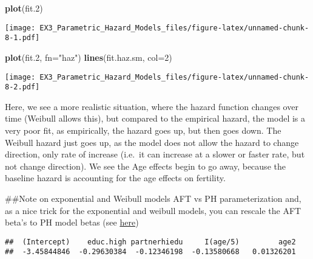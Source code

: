 \documentclass[
]{article}
\newenvironment{Shaded}{\begin{snugshade}}{\end{snugshade}}
\newcommand{\CommentTok}[1]{\textcolor[rgb]{0.56,0.35,0.01}{\textit{#1}}}
\newcommand{\DataTypeTok}[1]{\textcolor[rgb]{0.13,0.29,0.53}{#1}}
\newcommand{\DecValTok}[1]{\textcolor[rgb]{0.00,0.00,0.81}{#1}}
\newcommand{\FloatTok}[1]{\textcolor[rgb]{0.00,0.00,0.81}{#1}}
\newcommand{\KeywordTok}[1]{\textcolor[rgb]{0.13,0.29,0.53}{\textbf{#1}}}
\newcommand{\NormalTok}[1]{#1}
\newcommand{\OperatorTok}[1]{\textcolor[rgb]{0.81,0.36,0.00}{\textbf{#1}}}
\newcommand{\StringTok}[1]{\textcolor[rgb]{0.31,0.60,0.02}{#1}}
\begin{document}
\begin{Shaded}
\begin{Highlighting}[]
\KeywordTok{plot}\NormalTok{(fit}\FloatTok{.2}\NormalTok{)}
\end{Highlighting}
\end{Shaded}

\texttt{[image: EX3\_Parametric\_Hazard\_Models\_files/figure-latex/unnamed-chunk-8-1.pdf]}

\begin{Shaded}
\begin{Highlighting}[]
\KeywordTok{plot}\NormalTok{(fit}\FloatTok{.2}\NormalTok{, }\DataTypeTok{fn=}\StringTok{"haz"}\NormalTok{)}
\KeywordTok{lines}\NormalTok{(fit.haz.sm, }\DataTypeTok{col=}\DecValTok{2}\NormalTok{)}
\end{Highlighting}
\end{Shaded}

\texttt{[image: EX3\_Parametric\_Hazard\_Models\_files/figure-latex/unnamed-chunk-8-2.pdf]}

Here, we see a more realistic situation, where the hazard function
changes over time (Weibull allows this), but compared to the empirical
hazard, the model is a very poor fit, as empirically, the hazard goes
up, but then goes down. The Weibull hazard just goes up, as the model
does not allow the hazard to change direction, only rate of increase
(i.e.~it can increase at a slower or faster rate, but not change
direction). We see the Age effects begin to go away, because the
baseline hazard is accounting for the age effects on fertility.

\#\#Note on exponential and Weibull models AFT vs PH parameterization
and, as a nice trick for the exponential and weibull models, you can
rescale the AFT beta's to PH model betas (see
\href{http://www.statisticsmentor.com/2012/12/25/r-relationship-between-accelerated-failure-model-and-the-proportional-hazard-model-for-weibull/}{here})

\begin{Shaded}
\end{Shaded}

\begin{verbatim}
##  (Intercept)    educ.high partnerhiedu     I(age/5)         age2 
##  -3.45844846  -0.29630384  -0.12346198  -0.13580668   0.01326201
\end{verbatim}
\end{document}
